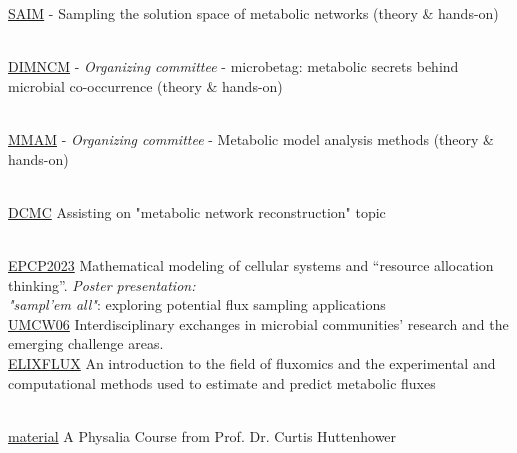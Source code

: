 

        {\href{https://ai-microbiome-school.onrender.com/}{SAIM}}
        {
            - Sampling the solution space of metabolic networks (theory \& hands-on)
        }{}

    \\[0.2ex]

        {\href{http://msysbiology.com/microbialdataintegration/}{DIMNCM}}
        {
            - \textit{Organizing committee}
            -  microbetag: metabolic secrets behind microbial co-occurrence (theory \& hands-on)
        }{}

    \\[0.2ex]


        {\href{https://metabolicmodelingantony2025.onrender.com/}{MMAM}}
        {
            - \textit{Organizing committee}
            - Metabolic model analysis methods (theory \& hands-on)
        }{}

    \\[0.2ex]
    
        {\href{http://msysbiology.com/microbedesign/}{DCMC}}
        {Assisting on "metabolic network reconstruction" topic}{}

    \\[0.2ex]

        {\href{https://appliedhologenomicsconference.eu}{EPCP2023}}
        {Mathematical modeling of cellular systems and “resource allocation thinking”. 
        \textit{Poster presentation: \\[0.2ex] "sampl'em all"}: exploring potential flux sampling applications}{}
    \\[0.2ex]
 
        {\href{https://www.newton.ac.uk/event/umcw06/}{UMCW06}}
        {Interdisciplinary exchanges in microbial communities' research and the emerging challenge areas.}{}
    \\[0.2ex]

    {\href{https://tess.elixir-europe.org/events/elixir-fluxomics-training-school-2021}{ELIXFLUX}}
    {An introduction to the field of fluxomics and the experimental and computational methods used to estimate and predict metabolic fluxes}{}

    \\[0.2ex]

    {\href{https://docs.google.com/spreadsheets/d/1YwJWejTxh7FLfooKCEJ18QCqvkYKAe5jFtwqQ7qU7bI/edit?gid=674784997\#gid=674784997}{material}}
    {A Physalia Course from Prof. Dr. Curtis Huttenhower}{}

